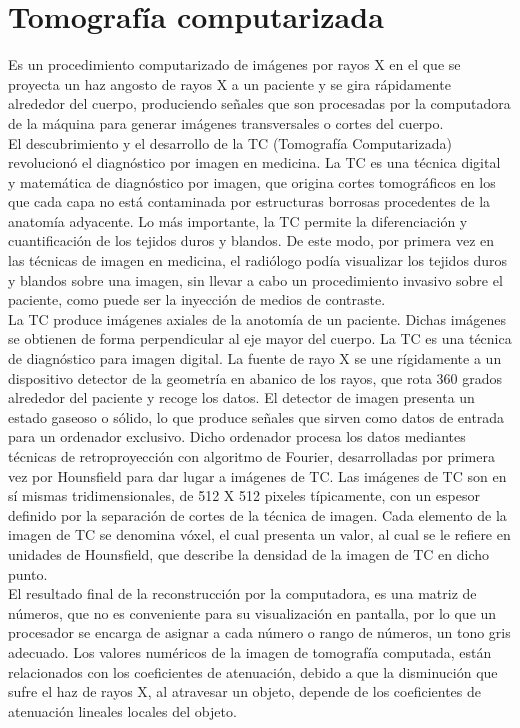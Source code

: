 \documentclass[12pt]{report}
\begin{document}
\section{Tomografía computarizada}
Es un procedimiento computarizado de imágenes por rayos X en el que se proyecta un haz angosto de rayos X a un paciente y se gira rápidamente alrededor del cuerpo, produciendo señales que son procesadas por la computadora de la máquina para generar imágenes transversales o cortes del cuerpo.\\
El descubrimiento y el desarrollo de la TC (Tomografía Computarizada) revolucionó el diagnóstico por imagen en medicina. La TC es una técnica digital y matemática de diagnóstico por imagen, que origina cortes tomográficos en los que cada capa no está contaminada por estructuras borrosas procedentes de la anatomía adyacente. Lo más importante, la TC permite la diferenciación y cuantificación de los tejidos duros y blandos. De este modo, por primera vez en las técnicas de imagen en medicina, el radiólogo podía visualizar los tejidos duros y blandos sobre una imagen, sin llevar a cabo un procedimiento invasivo sobre el paciente, como puede ser la inyección de medios de contraste.\\
La TC produce imágenes axiales de la anotomía de un paciente. Dichas imágenes se obtienen de forma perpendicular al eje mayor del cuerpo. La TC es una técnica de diagnóstico para imagen digital. La fuente de rayo X se une rígidamente a un dispositivo detector de la geometría en abanico de los rayos, que rota 360 grados alrededor del paciente y recoge los datos. El detector de imagen presenta un estado gaseoso o sólido, lo que produce señales que sirven como datos de entrada para un ordenador exclusivo. Dicho ordenador procesa los datos mediantes técnicas de retroproyección con algoritmo de Fourier, desarrolladas por primera vez por Hounsfield para dar lugar a imágenes de TC. Las imágenes de TC son en sí mismas tridimensionales, de 512 X 512 pixeles típicamente, con un espesor definido por la separación de cortes de la técnica de imagen. Cada elemento de la imagen de TC se denomina vóxel, el cual presenta un valor, al cual se le refiere en unidades de Hounsfield, que describe la densidad de la imagen de TC en dicho punto.\\
El resultado final de la reconstrucción por la computadora, es una matriz de números, que no es conveniente para su visualización en pantalla, por lo que un procesador se encarga de asignar a cada número o rango de números, un tono gris adecuado. Los valores numéricos de la imagen de tomografía computada, están relacionados con los coeficientes de atenuación, debido a que la disminución que sufre el haz de rayos X, al atravesar un objeto, depende de los coeficientes de atenuación lineales locales del objeto.\\
\end{document}
